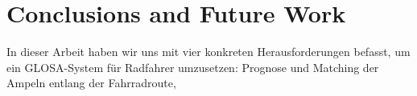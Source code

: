 \chapter{Conclusions and Future Work}\label{ch:conclusions}

In dieser Arbeit haben wir uns mit vier konkreten Herausforderungen befasst, um ein GLOSA-System für Radfahrer umzusetzen: Prognose und Matching der Ampeln entlang der Fahrradroute, 